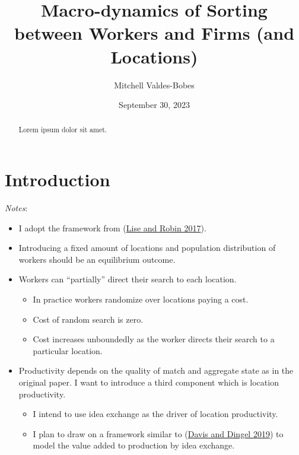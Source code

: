 \documentclass[
  letterpaper,
  DIV=11,
  numbers=noendperiod]{scrreprt}
\title{Macro-dynamics of Sorting between Workers and Firms (and
Locations)}
\author{Mitchell Valdes-Bobes}
\date{September 30, 2023}
\providecommand{\tightlist}{%
  \setlength{\itemsep}{0pt}\setlength{\parskip}{0pt}}\usepackage{longtable,booktabs,array}
\renewcommand*\contentsname{Table of contents}
\newcommand\contentsname{Table of contents}
\begin{document}
\maketitle
\begin{abstract}
Lorem ipsum dolor sit amet.
\end{abstract}
\ifdefined\Shaded\renewenvironment{Shaded}{\begin{tcolorbox}[frame hidden, interior hidden, boxrule=0pt, borderline west={3pt}{0pt}{shadecolor}, sharp corners, breakable, enhanced]}{\end{tcolorbox}}\fi

\renewcommand*\contentsname{Table of contents}
{
\hypersetup{linkcolor=}
\setcounter{tocdepth}{2}
\tableofcontents
}

\hypertarget{introduction}{%
\chapter{Introduction}\label{introduction}}

\emph{Notes}:

\begin{itemize}
\tightlist
\item
  I adopt the framework from
  (\protect\hyperlink{ref-liseMacrodynamicsSortingWorkers2017}{Lise and
  Robin 2017}).
\item
  Introducing a fixed amount of locations and population distribution of
  workers should be an equilibrium outcome.
\item
  Workers can ``partially'' direct their search to each location.

  \begin{itemize}
  \tightlist
  \item
    In practice workers randomize over locations paying a cost.
  \item
    Cost of random search is zero.
  \item
    Cost increases unboundedly as the worker directs their search to a
    particular location.
  \end{itemize}
\item
  Productivity depends on the quality of match and aggregate state as in
  the original paper. I want to introduce a third component which is
  location productivity.

  \begin{itemize}
  \tightlist
  \item
    I intend to use idea exchange as the driver of location
    productivity.
  \item
    I plan to draw on a framework similar to
    (\protect\hyperlink{ref-davisSpatialKnowledgeEconomy2019}{Davis and
    Dingel 2019}) to model the value added to production by idea
    exchange.
  \end{itemize}
\end{itemize}
\end{document}
